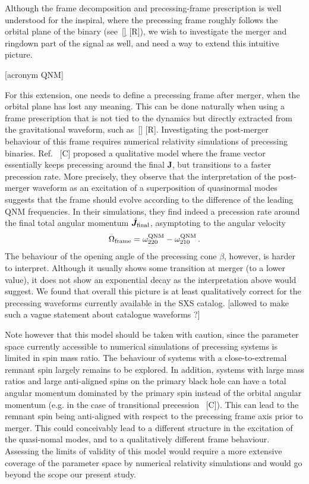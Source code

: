 \documentclass[aps,showpacs,twocolumn,
prd,superscriptaddress,nofootinbib]{revtex4-1}
\newcommand{\be}{\begin{equation}}
\newcommand{\ee}{\end{equation}}
\newcommand{\SM}[1]{{\color{Red} #1}}
\begin{document}
Although the frame decomposition and precessing-frame prescription is well understood for the inspiral, where the precessing frame roughly follows the orbital plane of the binary (see~\ref{} \SM{[R]}), we wish to investigate the merger and ringdown part of the signal as well, and need a way to extend this intuitive picture.

\SM{[acronym QNM]}

For this extension, one needs to define a precessing frame after merger, when the orbital plane has lost any meaning. This can be done naturally when using a frame prescription that is not tied to the dynamics but directly extracted from the gravitational waveform, such as~\eqref{} \SM{[R]}. Investigating the post-merger behaviour of this frame requires numerical relativity simulations of precessing binaries. Ref.~\cite{} \SM{[C]} proposed a qualitative model where the frame vector essentially keeps precessing around the final $\bm{J}$, but transitions to a faster precession rate. More precisely, they observe that the interpretation of the post-merger waveform as an excitation of a superposition of quasinormal modes suggests that the frame should evolve according to the difference of the leading QNM frequencies. In their simulations, they find indeed a precession rate around the final total angular momentum $\hat{\bm{J}}_{\rm final}$, asymptoting to the angular velocity
\be\label{eq:OmegaframeQNM}
	\Omega_{\rm frame} = \omega_{220}^{\rm QNM} - \omega_{210}^{\rm QNM} \,.
\ee
The behaviour of the opening angle of the precessing cone $\beta$, however, is harder to interpret. Although it usually shows some transition at merger (to a lower value), it does not show an exponential decay as the interpretation above would suggest. We found that overall this picture is at least qualitatively correct for the precessing waveforms	 currently available in the SXS catalog. \SM{[allowed to make such a vague statement about catalogue waveforms ?]}

Note however that this model should be taken with caution, since the parameter space currently accessible to numerical simulations of precessing systems is limited in spin mass ratio. The behaviour of systems with a close-to-extremal remnant spin largely remains to be explored. In addition, systems with large mass ratios and large anti-aligned spins on the primary black hole can have a total angular momentum dominated by the primary spin instead of the orbital angular momentum (e.g. in the case of transitional precession~\cite{} \SM{[C]}). This can lead to the remnant spin being anti-aligned with respect to the precessing frame axis prior to merger. This could conceivably lead to a different structure in the excitation of the quasi-nomal modes, and to a qualitatively different frame behaviour. Assessing the limits of validity of this model would require a more extensive coverage of the parameter space by numerical relativity simulations and would go beyond the scope our present study. 
\end{document}
